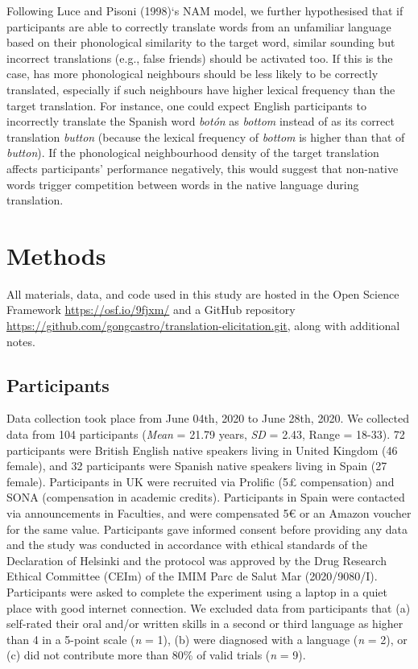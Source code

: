 \documentclass[
  english,
  man,floatsintext]{apa7}
\begin{document}
Following Luce and Pisoni (1998)`s NAM model, we further hypothesised that if participants are able to correctly translate words from an unfamiliar language based on their phonological similarity to the target word, similar sounding but incorrect translations (e.g., false friends) should be activated too. If this is the case, has more phonological neighbours should be less likely to be correctly translated, especially if such neighbours have higher lexical frequency than the target translation. For instance, one could expect English participants to incorrectly translate the Spanish word \emph{botón} as \emph{bottom} instead of as its correct translation \emph{button} (because the lexical frequency of \emph{bottom} is higher than that of \emph{button}). If the phonological neighbourhood density of the target translation affects participants' performance negatively, this would suggest that non-native words trigger competition between words in the native language during translation.

\hypertarget{methods}{%
\section{Methods}\label{methods}}

All materials, data, and code used in this study are hosted in the Open Science Framework \url{https://osf.io/9fjxm/} and a GitHub repository \url{https://github.com/gongcastro/translation-elicitation.git}, along with additional notes.

\hypertarget{participants}{%
\subsection{Participants}\label{participants}}

Data collection took place from June 04th, 2020 to June 28th, 2020. We collected data from 104 participants (\emph{Mean} = 21.79 years, \emph{SD} = 2.43, Range = 18-33). 72 participants were British English native speakers living in United Kingdom (46 female), and 32 participants were Spanish native speakers living in Spain (27 female). Participants in UK were recruited via Prolific (5£ compensation) and SONA (compensation in academic credits). Participants in Spain were contacted via announcements in Faculties, and were compensated 5€ or an Amazon voucher for the same value. Participants gave informed consent before providing any data and the study was conducted in accordance with ethical standards of the Declaration of Helsinki and the protocol was approved by the Drug Research Ethical Committee (CEIm) of the IMIM Parc de Salut Mar (2020/9080/I). Participants were asked to complete the experiment using a laptop in a quiet place with good internet connection. We excluded data from participants that (a) self-rated their oral and/or written skills in a second or third language as higher than 4 in a 5-point scale (\emph{n} = 1), (b) were diagnosed with a language (\emph{n} = 2), or (c) did not contribute more than 80\% of valid trials (\emph{n} = 9).
\end{document}
